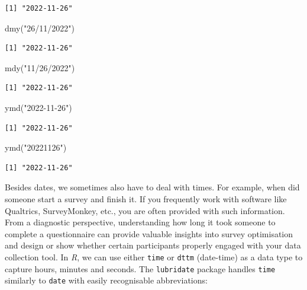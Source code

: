 \documentclass[
  letterpaper,
]{krantz}
\makeatletter
\newenvironment{Shaded}{\begin{snugshade}}{\end{snugshade}}
\newcommand{\FunctionTok}[1]{\textcolor[rgb]{0.28,0.35,0.67}{#1}}
\newcommand{\NormalTok}[1]{\textcolor[rgb]{0.00,0.23,0.31}{#1}}
\newcommand{\StringTok}[1]{\textcolor[rgb]{0.13,0.47,0.30}{#1}}
\newenvironment{kframe}{%
\medskip{}
\setlength{\fboxsep}{.8em}
 \def\at@end@of@kframe{}%
 \ifinner\ifhmode%
  \def\at@end@of@kframe{\end{minipage}}%
  \begin{minipage}{\columnwidth}%
 \fi\fi%
 \def\FrameCommand##1{\hskip\@totalleftmargin \hskip-\fboxsep
 \colorbox{shadecolor}{##1}\hskip-\fboxsep
     \hskip-\linewidth \hskip-\@totalleftmargin \hskip\columnwidth}%
 \MakeFramed {\advance\hsize-\width
   \@totalleftmargin\z@ \linewidth\hsize
   \@setminipage}}%
 {\par\unskip\endMakeFramed%
 \at@end@of@kframe}
\renewenvironment{Shaded}{\begin{kframe}}{\end{kframe}}
\makeatother
\begin{document}
\begin{verbatim}
[1] "2022-11-26"
\end{verbatim}

\begin{Shaded}
\begin{Highlighting}[]
\FunctionTok{dmy}\NormalTok{(}\StringTok{"26/11/2022"}\NormalTok{)}
\end{Highlighting}
\end{Shaded}

\begin{verbatim}
[1] "2022-11-26"
\end{verbatim}

\begin{Shaded}
\begin{Highlighting}[]
\FunctionTok{mdy}\NormalTok{(}\StringTok{"11/26/2022"}\NormalTok{)}
\end{Highlighting}
\end{Shaded}

\begin{verbatim}
[1] "2022-11-26"
\end{verbatim}

\begin{Shaded}
\begin{Highlighting}[]
\FunctionTok{ymd}\NormalTok{(}\StringTok{"2022{-}11{-}26"}\NormalTok{)}
\end{Highlighting}
\end{Shaded}

\begin{verbatim}
[1] "2022-11-26"
\end{verbatim}

\begin{Shaded}
\begin{Highlighting}[]
\FunctionTok{ymd}\NormalTok{(}\StringTok{"20221126"}\NormalTok{)}
\end{Highlighting}
\end{Shaded}

\begin{verbatim}
[1] "2022-11-26"
\end{verbatim}

Besides dates, we sometimes also have to deal with times. For example,
when did someone start a survey and finish it. If you frequently work
with software like Qualtrics, SurveyMonkey, etc., you are often provided
with such information. From a diagnostic perspective, understanding how
long it took someone to complete a questionnaire can provide valuable
insights into survey optimisation and design or show whether certain
participants properly engaged with your data collection tool. In
\emph{R}, we can use either \texttt{time} or \texttt{dttm} (date-time)
as a data type to capture hours, minutes and seconds. The
\texttt{lubridate} package handles \texttt{time} similarly to
\texttt{date} with easily recognisable abbreviations:
\end{document}
